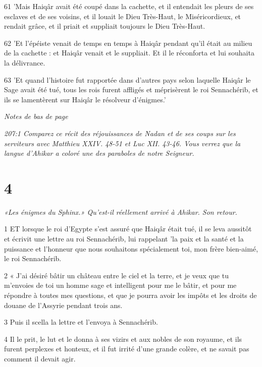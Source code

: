 \par 61 'Mais Haiqâr avait été coupé dans la cachette, et il entendait les pleurs de ses esclaves et de ses voisins, et il louait le Dieu Très-Haut, le Miséricordieux, et rendait grâce, et il priait et suppliait toujours le Dieu Très-Haut.

\par 62 'Et l'épéiste venait de temps en temps à Haiqâr pendant qu'il était au milieu de la cachette : et Haiqâr venait et le suppliait. Et il le réconforta et lui souhaita la délivrance.

\par 63 'Et quand l'histoire fut rapportée dans d'autres pays selon laquelle Haiqâr le Sage avait été tué, tous les rois furent affligés et méprisèrent le roi Sennachérib, et ils se lamentèrent sur Haiqâr le résolveur d'énigmes.'

\par \textit{Notes de bas de page}

\par \textit{207:1 Comparez ce récit des réjouissances de Nadan et de ses coups sur les serviteurs avec Matthieu XXIV. 48-51 et Luc XII. 43-46. Vous verrez que la langue d'Ahikar a coloré une des paraboles de notre Seigneur.}

\chapter{4}

\par \textit{«Les énigmes du Sphinx.» Qu'est-il réellement arrivé à Ahikar. Son retour.}

\par 1 ET lorsque le roi d'Egypte s'est assuré que Haiqâr était tué, il se leva aussitôt et écrivit une lettre au roi Sennachérib, lui rappelant 'la paix et la santé et la puissance et l'honneur que nous souhaitons spécialement toi, mon frère bien-aimé, le roi Sennachérib.

\par 2 « J'ai désiré bâtir un château entre le ciel et la terre, et je veux que tu m'envoies de toi un homme sage et intelligent pour me le bâtir, et pour me répondre à toutes mes questions, et que je pourra avoir les impôts et les droits de douane de l'Assyrie pendant trois ans.

\par 3 Puis il scella la lettre et l'envoya à Sennachérib.

\par 4 Il le prit, le lut et le donna à ses vizirs et aux nobles de son royaume, et ils furent perplexes et honteux, et il fut irrité d'une grande colère, et ne savait pas comment il devait agir.

